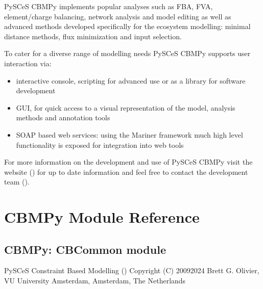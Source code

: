 \documentclass[letterpaper,10pt,english]{sphinxmanual}
\begin{document}
\sphinxAtStartPar
PySCeS CBMPy implements popular analyses such as FBA, FVA, element/charge balancing, network analysis and model editing as
well as advanced methods developed specifically for the ecosystem modelling: minimal distance methods, flux minimization and input selection.

\sphinxAtStartPar
To cater for a diverse range of modelling needs PySCeS CBMPy supports user interaction via:
\begin{itemize}
\item {} 
\sphinxAtStartPar
interactive console, scripting for advanced use or as a library for software development

\item {} 
\sphinxAtStartPar
GUI, for quick access to a visual representation of the model, analysis methods and annotation tools

\item {} 
\sphinxAtStartPar
SOAP based web services: using the Mariner framework much high level functionality is exposed for integration into web tools

\end{itemize}

\sphinxAtStartPar
For more information on the development and use of PySCeS CBMPy visit the website () for up to date information and
feel free to contact the development team ().

\sphinxstepscope


\chapter{CBMPy Module Reference}
\label{\detokenize{modules_doc:module-cbmpy.CBCommon}}\label{\detokenize{modules_doc:cbmpy-module-reference}}\label{\detokenize{modules_doc::doc}}

\section{CBMPy: CBCommon module}
\label{\detokenize{modules_doc:cbmpy-cbcommon-module}}
\sphinxAtStartPar
PySCeS Constraint Based Modelling ()
Copyright (C) 2009\sphinxhyphen{}2024 Brett G. Olivier, VU University Amsterdam, Amsterdam, The Netherlands
\end{document}
